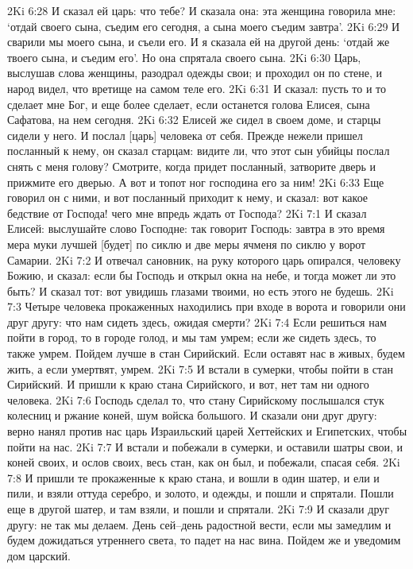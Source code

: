 2Ki 6:28  И сказал ей царь: что тебе? И сказала она: эта женщина говорила мне: `отдай своего сына, съедим его сегодня, а сына моего съедим завтра'.
2Ki 6:29  И сварили мы моего сына, и съели его. И я сказала ей на другой день: `отдай же твоего сына, и съедим его'. Но она спрятала своего сына.
2Ki 6:30  Царь, выслушав слова женщины, разодрал одежды свои; и проходил он по стене, и народ видел, что вретище на самом теле его.
2Ki 6:31  И сказал: пусть то и то сделает мне Бог, и еще более сделает, если останется голова Елисея, сына Сафатова, на нем сегодня.
2Ki 6:32  Елисей же сидел в своем доме, и старцы сидели у него. И послал [царь] человека от себя. Прежде нежели пришел посланный к нему, он сказал старцам: видите ли, что этот сын убийцы послал снять с меня голову? Смотрите, когда придет посланный, затворите дверь и прижмите его дверью. А вот и топот ног господина его за ним!
2Ki 6:33  Еще говорил он с ними, и вот посланный приходит к нему, и сказал: вот какое бедствие от Господа! чего мне впредь ждать от Господа?
2Ki 7:1  И сказал Елисей: выслушайте слово Господне: так говорит Господь: завтра в это время мера муки лучшей [будет] по сиклю и две меры ячменя по сиклю у ворот Самарии.
2Ki 7:2  И отвечал сановник, на руку которого царь опирался, человеку Божию, и сказал: если бы Господь и открыл окна на небе, и тогда может ли это быть? И сказал тот: вот увидишь глазами твоими, но есть этого не будешь.
2Ki 7:3  Четыре человека прокаженных находились при входе в ворота и говорили они друг другу: что нам сидеть здесь, ожидая смерти?
2Ki 7:4  Если решиться нам пойти в город, то в городе голод, и мы там умрем; если же сидеть здесь, то также умрем. Пойдем лучше в стан Сирийский. Если оставят нас в живых, будем жить, а если умертвят, умрем.
2Ki 7:5  И встали в сумерки, чтобы пойти в стан Сирийский. И пришли к краю стана Сирийского, и вот, нет там ни одного человека.
2Ki 7:6  Господь сделал то, что стану Сирийскому послышался стук колесниц и ржание коней, шум войска большого. И сказали они друг другу: верно нанял против нас царь Израильский царей Хеттейских и Египетских, чтобы пойти на нас.
2Ki 7:7  И встали и побежали в сумерки, и оставили шатры свои, и коней своих, и ослов своих, весь стан, как он был, и побежали, спасая себя.
2Ki 7:8  И пришли те прокаженные к краю стана, и вошли в один шатер, и ели и пили, и взяли оттуда серебро, и золото, и одежды, и пошли и спрятали. Пошли еще в другой шатер, и там взяли, и пошли и спрятали.
2Ki 7:9  И сказали друг другу: не так мы делаем. День сей--день радостной вести, если мы замедлим и будем дожидаться утреннего света, то падет на нас вина. Пойдем же и уведомим дом царский.
